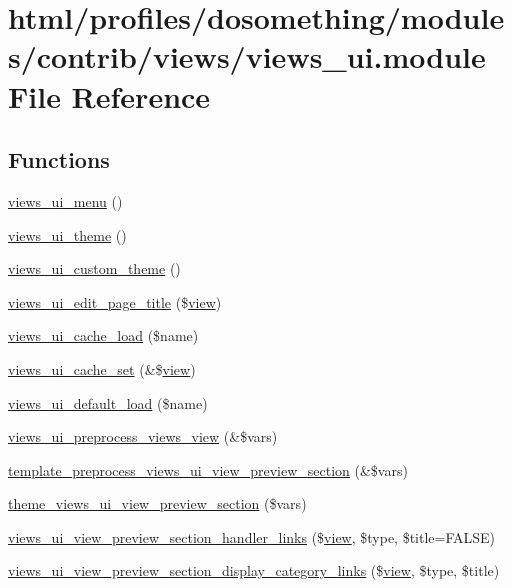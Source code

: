 \hypertarget{views__ui_8module}{
\section{html/profiles/dosomething/modules/contrib/views/views\_\-ui.module File Reference}
\label{views__ui_8module}
}
\subsection*{Functions}
\begin{DoxyCompactItemize}
\item 
\hyperlink{views__ui_8module_add533a59614ea6c7758f4d428150f3a6}{views\_\-ui\_\-menu} ()
\item 
\hyperlink{views__ui_8module_acf90ef9b70c0c8bf9300247b6325aedb}{views\_\-ui\_\-theme} ()
\item 
\hyperlink{views__ui_8module_a9b0eb98e71715cf1d082f0b0c3f1121e}{views\_\-ui\_\-custom\_\-theme} ()
\item 
\hyperlink{views__ui_8module_aac98d6c71b5ab337edf517fc59f2cddf}{views\_\-ui\_\-edit\_\-page\_\-title} (\$\hyperlink{classview}{view})
\item 
\hyperlink{views__ui_8module_a89d147761be3afc8b2728b071a2ac7f8}{views\_\-ui\_\-cache\_\-load} (\$name)
\item 
\hyperlink{views__ui_8module_a7694cbe9024fe6cde4b0c2a9f53fc279}{views\_\-ui\_\-cache\_\-set} (\&\$\hyperlink{classview}{view})
\item 
\hyperlink{views__ui_8module_a5457ed35c0e4b1764846ba4a0b74224f}{views\_\-ui\_\-default\_\-load} (\$name)
\item 
\hyperlink{views__ui_8module_aa14dbf312575836186d709cdaea5856f}{views\_\-ui\_\-preprocess\_\-views\_\-view} (\&\$vars)
\item 
\hyperlink{views__ui_8module_aa7dae7204d3172c008b70fb345f5738c}{template\_\-preprocess\_\-views\_\-ui\_\-view\_\-preview\_\-section} (\&\$vars)
\item 
\hyperlink{views__ui_8module_a9c4eea67a43b66c32761d5ac40f32b70}{theme\_\-views\_\-ui\_\-view\_\-preview\_\-section} (\$vars)
\item 
\hyperlink{views__ui_8module_a3ae40cf905b934b3054625fdcff0042d}{views\_\-ui\_\-view\_\-preview\_\-section\_\-handler\_\-links} (\$\hyperlink{classview}{view}, \$type, \$title=FALSE)
\item 
\hyperlink{views__ui_8module_a768c0cc9ef12c3efe404e8192863e01f}{views\_\-ui\_\-view\_\-preview\_\-section\_\-display\_\-category\_\-links} (\$\hyperlink{classview}{view}, \$type, \$title)

\end{DoxyCompactItemize}

